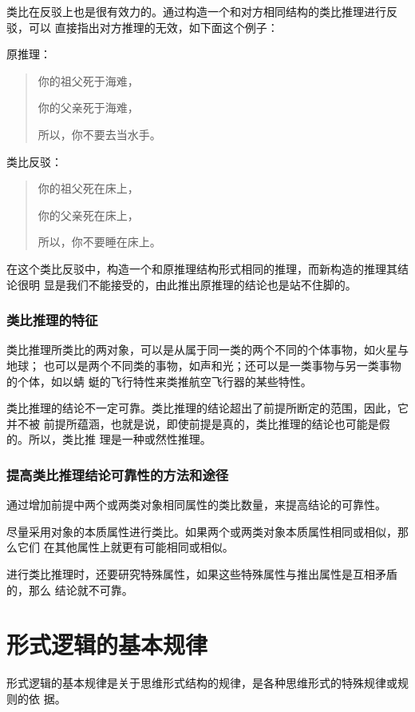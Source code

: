 \documentclass[final,oneside]{ctexbook}
\newenvironment{equotation}{\begin{quotation}\kaishu}{\end{quotation}}
\begin{document}
类比在反驳上也是很有效力的。通过构造一个和对方相同结构的类比推理进行反驳，可以
直接指出对方推理的无效，如下面这个例子：

原推理：
\begin{equotation}
  你的祖父死于海难，

  你的父亲死于海难，

  所以，你不要去当水手。
\end{equotation}
类比反驳：
\begin{equotation}
  你的祖父死在床上，

  你的父亲死在床上，

  所以，你不要睡在床上。
\end{equotation}

在这个类比反驳中，构造一个和原推理结构形式相同的推理，而新构造的推理其结论很明
显是我们不能接受的，由此推出原推理的结论也是站不住脚的。

\subsubsection{类比推理的特征}

类比推理所类比的两对象，可以是从属于同一类的两个不同的个体事物，如火星与地球；
也可以是两个不同类的事物，如声和光；还可以是一类事物与另一类事物的个体，如以蜻
蜓的飞行特性来类推航空飞行器的某些特性。

类比推理的结论不一定可靠。类比推理的结论超出了前提所断定的范围，因此，它并不被
前提所蕴涵，也就是说，即使前提是真的，类比推理的结论也可能是假的。所以，类比推
理是一种或然性推理。

\subsubsection{提高类比推理结论可靠性的方法和途径}

通过增加前提中两个或两类对象相同属性的类比数量，来提高结论的可靠性。

尽量采用对象的本质属性进行类比。如果两个或两类对象本质属性相同或相似，那么它们
在其他属性上就更有可能相同或相似。

进行类比推理时，还要研究特殊属性，如果这些特殊属性与推出属性是互相矛盾的，那么
结论就不可靠。

\section{形式逻辑的基本规律}

形式逻辑的基本规律是关于思维形式结构的规律，是各种思维形式的特殊规律或规则的依
据。
\end{document}
